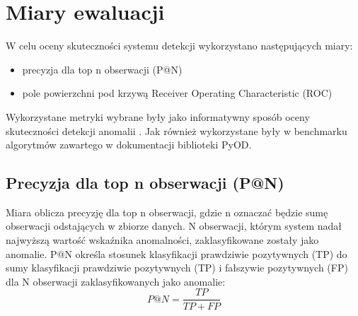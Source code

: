 \section{Miary ewaluacji}
W celu oceny skuteczności systemu detekcji wykorzystano następujących miary:
\begin{itemize}
    \item  precyzja dla top n obserwacji (P@N)
    \item pole powierzchni pod krzywą Receiver Operating Characteristic (ROC)

\end{itemize}
Wykorzystane metryki wybrane były jako informatywny sposób oceny skuteczności detekcji anomalii \cite{campos2016evaluation}. Jak również wykorzystane były w benchmarku algorytmów zawartego w dokumentacji biblioteki PyOD.

\subsection{Precyzja dla top n obserwacji (P@N)}
    Miara oblicza precyzję dla top n obserwacji, gdzie n oznaczać będzie sumę obserwacji odstających w zbiorze danych. N obserwacji, którym system nadał najwyższą wartość wskaźnika anomalności, zaklasyfikowane zostały jako anomalie. P@N określa stosunek klasyfikacji prawdziwie pozytywnych (TP) do sumy klasyfikacji prawdziwie pozytywnych (TP) i fałszywie pozytywnych (FP) dla N obserwacji zaklasyfikowanych jako anomalie:
    \begin{equation}
        P@N = \frac{TP}{TP+FP}
    \end{equation}
